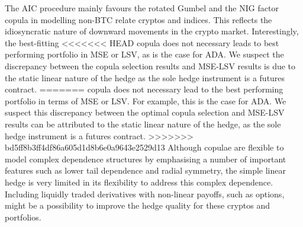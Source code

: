 The AIC procedure mainly favours the rotated Gumbel and the NIG
factor copula in modelling non-BTC relate cryptos and indices. This
reflects the idiosyncratic nature of 
downward movements in the crypto market. Interestingly, the best-fitting
<<<<<<< HEAD
copula does not necessary leads to best performing portfolio in MSE or
LSV, as is the case for ADA.
We suspect the discrepancy between the copula selection results and MSE-LSV results is due to the static linear nature of the
hedge as the sole hedge instrument is a futures contract. 
=======
copula does not necessary lead to the best performing portfolio in
terms of MSE or LSV. For example, this is the case for ADA.
We suspect this discrepancy between the optimal copula selection and
MSE-LSV results can be attributed to the static linear nature of the
hedge, as the sole hedge instrument is a futures contract. 
>>>>>>> bd5ff8b3ff4df86a605d1d8b6e0a9643e2529d13
Although copulae are flexible to model complex dependence structures
by emphasising a number of important features such as lower tail
dependence and radial symmetry, the simple linear hedge is very
limited in its flexibility to address this complex dependence.
Including liquidly traded derivatives with non-linear payoffs, such as
options, might be a possibility to improve the hedge quality for these
cryptos and portfolios. 




